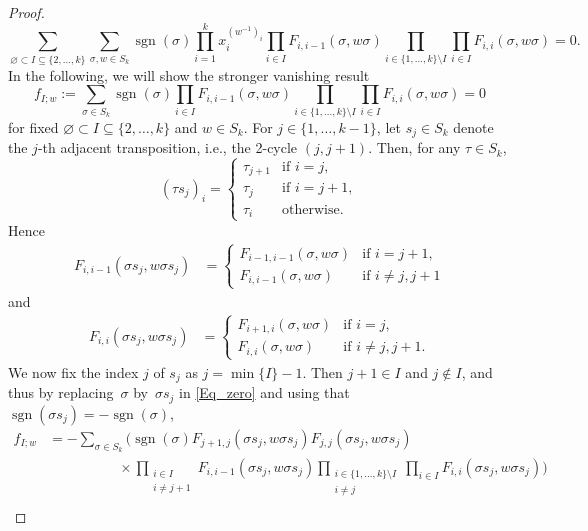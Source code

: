 \documentclass[pdftex]{sigma}
\numberwithin{equation}{section}
\DeclareMathOperator{\sgn}{sgn}
\begin{document}
\begin{proof}
\[
\sum_{\varnothing\subset I\subseteq\{2,\dots,k\}}
\sum_{\sigma,w\in S_k}\sgn(\sigma)
\prod_{i=1}^k x_i^{(w^{-1})_i}
\prod_{i\in I} F_{i,i-1}(\sigma,w\sigma)
\prod_{i\in\{1,\dots,k\}\setminus I}
\prod_{i\in I} F_{i,i}(\sigma,w\sigma)=0.
\]
In the following, we will show the stronger vanishing result
\begin{equation}\label{Eq_zero}
f_{I;w}:=\sum_{\sigma\in S_k}\sgn(\sigma)
\prod_{i\in I} F_{i,i-1}(\sigma,w\sigma)
\prod_{i\in\{1,\dots,k\}\setminus I}
\prod_{i\in I} F_{i,i}(\sigma,w\sigma)=0
\end{equation}
for fixed $\varnothing\subset I\subseteq\{2,\dots,k\}$ and $w\in S_k$.
For $j\in\{1,\dots,k-1\}$, let $s_j\in S_k$ denote the $j$-th adjacent
transposition, i.e., the 2-cycle $(j,j+1)$.
Then, for any $\tau\in S_k$,
\[
(\tau s_j)_i=\begin{cases}
\tau_{j+1} & \text{if $i=j$}, \\
\tau_j & \text{if $i=j+1$}, \\
\tau_i & \text{otherwise}.
\end{cases}
\]
Hence
\begin{align*}
F_{i,i-1}(\sigma s_j,w\sigma s_j)&=\begin{cases}
F_{i-1,i-1}(\sigma,w\sigma) & \text{if $i=j+1$}, \\
F_{i,i-1}(\sigma,w\sigma) & \text{if $i\neq j,j+1$}
\end{cases}
\end{align*}
and
\begin{align*}
F_{i,i}(\sigma s_j,w\sigma s_j)&=\begin{cases}
F_{i+1,i}(\sigma,w\sigma) & \text{if $i=j$}, \\
F_{i,i}(\sigma,w\sigma) & \text{if $i\neq j,j+1$}.
\end{cases}
\end{align*}
We now fix the index $j$ of $s_j$ as $j=\min\{I\}-1$.
Then $j+1\in I$ and $j\notin I$, and thus by replacing~$\sigma$
by~$\sigma s_j$ in \eqref{Eq_zero} and using that
$\sgn(\sigma s_j)=-\sgn(\sigma)$,
\begin{align*}
f_{I;w}&=-
\sum_{\sigma\in S_k}\biggl(\sgn(\sigma)
F_{j+1,j}(\sigma s_j,w\sigma s_j) F_{j,j}(\sigma s_j,w\sigma s_j) \\
& \qquad\qquad\quad\times
\prod_{\substack{i\in I\\[1pt] i\neq j+1}} F_{i,i-1}(\sigma s_j,w\sigma s_j)
\prod_{\substack{i\in\{1,\dots,k\}\setminus I \\[1pt] i\neq j}}
\prod_{i\in I} F_{i,i}(\sigma s_j,w\sigma s_j)\biggr) \\

\end{align*}
\end{proof}
\end{document}
